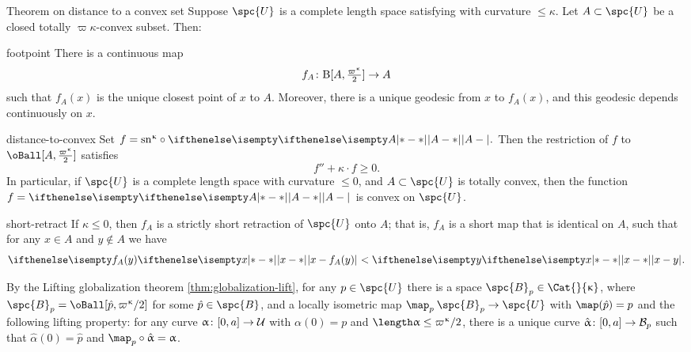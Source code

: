 \begin{thm}{Theorem on distance to a convex set} 
\label{thm:retract-to-convex} 
Suppose $\spc{U}$ is  a complete  length space satisfying with curvature $\le\kappa$.  Let  $A\subset\spc{U} $  be a closed totally $\varpi\kappa$-convex subset. 
Then:

\begin{subthm}{footpoint}
There is a continuous map 
$$f_A\: \oBall[A,\tfrac{\varpi\kappa}{2}]\to A$$
	such that  $f_A(x)$ is the unique closest  point of $x$ to $A$. 
Moreover, there is a unique geodesic from $x$ to $f_A(x)$, and this geodesic depends continuously on $x$.  \end{subthm}



\begin{subthm}{distance-to-convex}
Set
$f=\sn{\kappa}\circ\dist{A}{}{}.$
Then the  restriction of $f$ to  $\oBall[A,\tfrac{\varpi\kappa}{2}]$  satisfies \[f''+\kappa\cdot f\ge 0%
 .\]
In particular, if $\spc{U}$ is a complete  length space  with curvature $\le0$, and $A\subset\spc{U}$  is  totally convex, then the  function
$f= \dist{A}{}{}$
is convex on $\spc{U}$.
\end{subthm} 

\begin{subthm}{short-retract} 
If $\kappa\le 0$,
then $f_A$ is a strictly short retraction of $\spc{U}$ onto $A$;
that is, $f_A$ is a short map
that is identical on $A$, such that for any $x\in A$ and $y\notin A$ we have 
\[\dist{x}{f_A(y)}{}<\dist{x}{y}{}.\]
 \end{subthm}
\end{thm}
By the Lifting globalization theorem  \ref{thm:globalization-lift}, for any  $p\in\spc{U}$
 there is a space $\spc{B}_p\in\Cat{}{\kappa}$, where $\spc{B}_p=\oBall[\hat p,\varpi\kappa/2]$ for some $\hat p \in \spc{B}$,
and a locally isometric map $\map_p\:\spc{B}_p\to\spc{U}$
with $\map(\hat p)=p$ and the following lifting property: 
for any curve $\alpha\:[0,a]\to\spc{U}$ with $\alpha(0)=p$ and $\length\alpha\le\varpi\kappa/2$,
there is a unique curve $\hat\alpha \:[0,a]\to \spc{B}_p$ such that $\hat\alpha (0) = \hat p$ and $\map_p\circ\hat\alpha=\alpha$.

